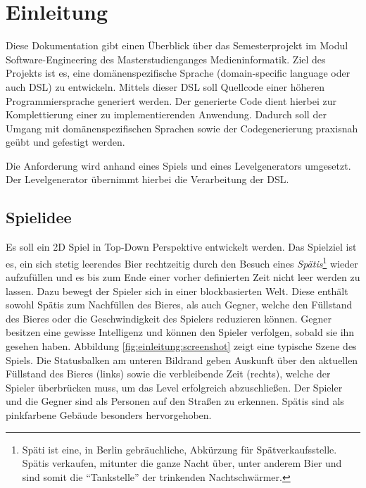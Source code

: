 \section{Einleitung}

Diese Dokumentation gibt einen Überblick über das Semesterprojekt im Modul Software-Engineering des Masterstudienganges Medieninformatik.
Ziel des Projekts ist es, eine domänenspezifische Sprache (domain-specific language oder auch DSL) zu entwickeln.
Mittels dieser DSL soll \mbox{Quellcode} einer höheren Programmiersprache generiert werden.
Der generierte \mbox{Code} dient hierbei zur Komplettierung einer zu implementierenden Anwendung.
Dadurch soll der Umgang mit domänenspezifischen Sprachen sowie der Codegenerierung praxisnah geübt und gefestigt werden.

Die Anforderung wird anhand eines Spiels und eines Levelgenerators umgesetzt.
Der Levelgenerator übernimmt hierbei die Verarbeitung der DSL.

\subsection{Spielidee}

Es soll ein 2D Spiel in Top-Down Perspektive entwickelt werden.
Das Spielziel ist es, ein sich stetig leerendes Bier rechtzeitig durch den Besuch eines \textit{Spätis}\footnote{Späti ist eine, in Berlin gebräuchliche, Abkürzung für Spätverkaufsstelle. Spätis verkaufen, mitunter die ganze Nacht über, unter anderem Bier und sind somit die ``Tankstelle'' der trinkenden Nachtschwärmer.}
wieder aufzufüllen und es bis zum Ende einer vorher definierten Zeit nicht leer werden zu lassen.
Dazu bewegt der Spieler sich in einer blockbasierten Welt.
Diese enthält sowohl Spätis zum Nachfüllen des Bieres, als auch Gegner, welche den Füllstand des Bieres oder die Geschwindigkeit des Spielers reduzieren können.
Gegner besitzen eine gewisse Intelligenz und können den Spieler verfolgen, sobald sie ihn gesehen haben.
Abbildung \ref{fig:einleitung:screenshot} zeigt eine typische Szene des Spiels.
Die Statusbalken am unteren Bildrand geben Auskunft über den aktuellen Füllstand des Bieres (links) sowie die verbleibende Zeit (rechts), welche der Spieler überbrücken muss, um das Level erfolgreich abzuschließen.
Der Spieler und die Gegner sind als Personen auf den Straßen zu erkennen.
Spätis sind als pinkfarbene Gebäude besonders hervorgehoben.

